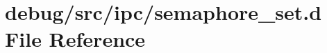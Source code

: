 \hypertarget{semaphore__set_8d}{
\section{debug/src/ipc/semaphore\_\-set.d File Reference}
\label{semaphore__set_8d}
}
